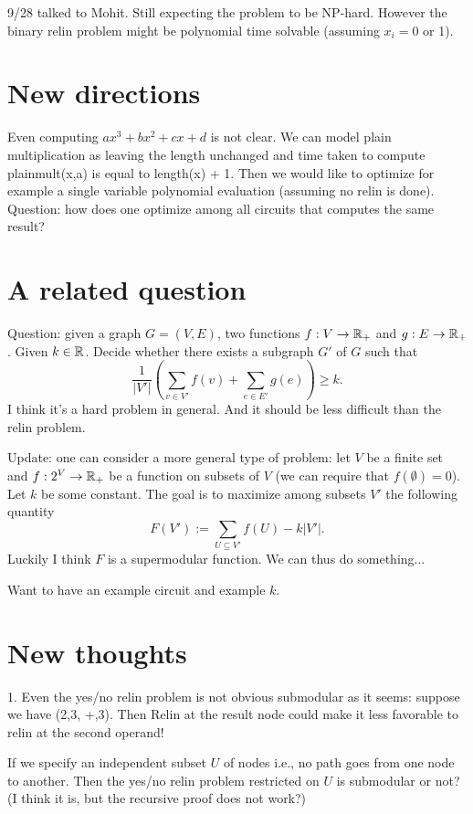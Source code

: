 \documentclass[11pt]{article} %
\theoremstyle{plain}
\theoremstyle{definition}
\begin{document}
9/28 talked to Mohit. Still expecting the problem to be NP-hard. However the binary relin problem might be 
polynomial time solvable (assuming $x_i = 0$ or 1). 
\fi


\iffalse
\section{New directions}
Even  computing $ax^3 + bx^2 +cx +d$ is not clear. We can model plain multiplication as 
leaving the length unchanged and time taken to compute plainmult(x,a) is equal to length(x) + 1. 
Then we would like to optimize for example a single variable polynomial evaluation (assuming 
no relin is done). Question: how does one optimize among all circuits that computes the same 
result? 

\section{A related question}

Question: given a graph $G = (V,E)$, two functions $f: V \to \mathbb{R}_+$ and $g: E \to \mathbb{R}_+$. Given 
$k \in \mathbb{R}$. Decide whether there exists a subgraph $G'$ of $G$ such that 
\[
	\frac{1}{|V'|} (\sum_{v \in V'} f(v) + \sum_{e \in E'} g(e) )  \geq k. 
\]
I think it's a hard problem in general. And it should be less difficult than the relin problem. 

Update: one can consider a more general type of problem: let $V$ be a finite set and $f: 2^V \to \mathbb{R}_+$
be a function on subsets of $V$ (we can require that $f(\emptyset) = 0$). Let $k$ be some constant. 
The goal is to maximize among subsets $V'$ the following quantity
\[
	F(V') :=	\sum_{U \subseteq V'} f(U) - k|V'|. 
\]
Luckily I think $F$ is  a supermodular function. We can thus do something...

Want to have an example circuit and example $k$. 



\section{New thoughts}

1. Even the yes/no relin problem is not obvious submodular as it seems: suppose we have (2,3, +,3). 
Then Relin at the result node could make it less favorable to relin at the second operand! 

If we specify an independent subset $U$ of nodes i.e., no path goes from one node to another. Then the yes/no relin problem restricted on $U$ is submodular or not? (I think it is, but the recursive proof does not work?) 
\end{document}
